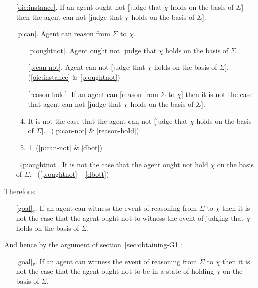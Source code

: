 \documentclass[10pt]{article}
\begin{document}
\begin{enumerate}
\item[\ref{oic:instance}.] If an agent ought not [judge that \(\chi\) holds on the basis of \(\Sigma\)] then the agent can not [judge that \(\chi\) holds on the basis of \(\Sigma\)].
\item[\ref{p:can}.] Agent can reason from \(\Sigma\) to \(\chi\).
  \begin{enumerate}[ref=\alph*.]
  \item[\ref{p:oughtnot}.] Agent ought not [judge that \(\chi\) holds on the basis of \(\Sigma\)].
  \item[\ref{p:can-not}.] Agent can not [judge that \(\chi\) holds on the basis of \(\Sigma\)]. \hfill (\ref{oic:instance} \& \ref{p:oughtnot})
  \item[\ref{reason-hold}.] If an agent can [reason from \(\Sigma\) to \(\chi\)] then it is not the case that agent can not [judge that \(\chi\) holds on the basis of \(\Sigma\)].
  \item\label{dbot} It is not the case that the agent can not [judge that \(\chi\) holds on the basis of \(\Sigma\)].
  \mbox{ }\hfill (\ref{p:can-not} \& \ref{reason-hold})
  \item\label{dbott} \(\bot\) \hfill (\ref{p:can-not} \& \ref{dbot})
  \end{enumerate}
\item[\(\lnot\)\ref{p:oughtnot}.] It is not the case that the agent ought not hold \(\chi\) on the basis of \(\Sigma\).\linebreak
  \mbox{ }\hfill (\ref{p:oughtnot} -- \ref{dbott})
\end{enumerate}

Therefore:

\begin{enumerate}[label=G\arabic*., ref=G\arabic*]
\item[\ref{goal}\(_{e}\).] If an agent can witness the event of reasoning from \(\Sigma\) to \(\chi\) then it is not the case that the agent ought not to witness the event of judging that \(\chi\) holds on the basis of \(\Sigma\).
\end{enumerate}

And hence by the argument of section~\ref{sec:obtaining-G1}:

\begin{enumerate}[label=G\arabic*., ref=G\arabic*]
\item[\ref{goal}\(_{v}\).] If an agent can witness the event of reasoning from \(\Sigma\) to \(\chi\) then it is not the case that the agent ought not to be in a state of holding \(\chi\) on the basis of \(\Sigma\).
\end{enumerate}
\end{document}
